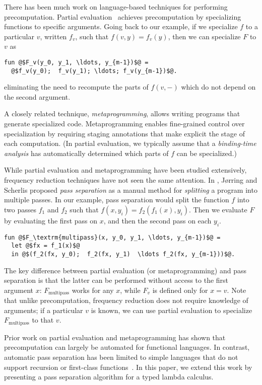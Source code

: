 There has been much work on language-based techniques for performing
precomputation. Partial evaluation~\cite{futamura71,jones96} achieves
precomputation by specializing functions to specific arguments. Going back to
our example, if we specialize $f$ to a particular $v$, written $f_v$, such that
$f(v,y) = f_v(y)$, then we can specialize $F$ to $v$ as
\begin{lstlisting}
fun @$F_v(y_0, y_1, \ldots, y_{m-1})$@ = 
  @$f_v(y_0);  f_v(y_1); \ldots; f_v(y_{m-1})$@.
\end{lstlisting}
eliminating the need to recompute the parts of $f(v,-)$ which do not depend on
the second argument.

A closely related technique, {\em metaprogramming}, allows writing programs that
generate specialized code. Metaprogramming enables fine-grained control over
specialization by requiring staging annotations that make explicit the stage of
each computation. (In partial evaluation, we typically assume that a
\emph{binding-time analysis} has automatically determined which parts of $f$ can
be specialized.)

While partial evaluation and metaprogramming have been studied extensively,
frequency reduction techniques have not seen the same attention. In
\cite{JS86-staging}, J{\o}rring and Scherlis proposed {\em pass separation} as a
manual method for {\em splitting} a program into multiple passes.
%
In our example, pass separation would split the function $f$ into two passes
$f_1$ and $f_2$ such that $f(x,y_i) = f_2(f_1(x),y_i)$. Then we evaluate $F$ by
evaluating the first pass on $x$, and then the second pass on each $y_i$.
%
\begin{lstlisting}
fun @$F_\textrm{multipass}(x, y_0, y_1, \ldots, y_{m-1})$@ = 
  let @$fx = f_1(x)$@
  in @$(f_2(fx, y_0);  f_2(fx, y_1)  \ldots f_2(fx, y_{m-1}))$@.
\end{lstlisting}
%
The key difference between partial evaluation (or metaprogramming) and
pass separation is that the latter can be performed without access to
the first argument $x$: $F_\textrm{multipass}$ works for any $x$,
while $F_v$ is defined only for $x=v$.  Note that unlike
precomputation, frequency reduction does not require knowledge of
arguments; if a particular $v$ is known, we can use partial evaluation
to specialize $F_\textrm{multipass}$ to that $v$.

Prior work on partial evaluation and metaprogramming has shown that
precomputation can largely be automated for functional languages. In contrast,
automatic pass separation has been limited to simple languages that do not
support recursion or first-class
functions~\cite{knoblock96,Proudfoot:2001,Foley:2011,He:2014}. In this paper, we
extend this work by presenting a pass separation algorithm for a typed lambda
calculus.

